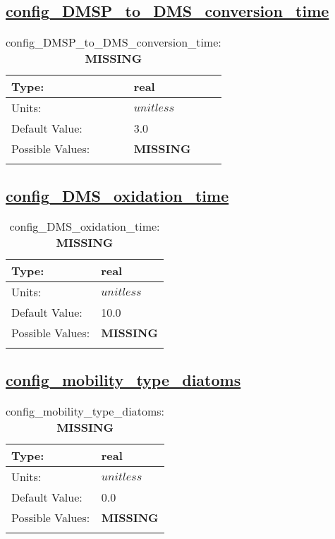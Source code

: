 \subsection[config\_DMSP\_to\_DMS\_conversion\_time]{\hyperref[sec:nm_tab_biogeochemistry]{config\_DMSP\_to\_DMS\_conversion\_time}}
\label{subsec:nm_sec_config_DMSP_to_DMS_conversion_time}
\begin{center}
\begin{longtable}{| p{2.0in} || p{4.0in} |}
    \hline
    Type: & real \\
    \hline
    Units: & $unitless$ \\
    \hline
    Default Value: & 3.0 \\
    \hline
    Possible Values: & {\bf \color{red} MISSING} \\
    \hline
    \caption{config\_DMSP\_to\_DMS\_conversion\_time: {\bf \color{red} MISSING}}
\end{longtable}
\end{center}
\subsection[config\_DMS\_oxidation\_time]{\hyperref[sec:nm_tab_biogeochemistry]{config\_DMS\_oxidation\_time}}
\label{subsec:nm_sec_config_DMS_oxidation_time}
\begin{center}
\begin{longtable}{| p{2.0in} || p{4.0in} |}
    \hline
    Type: & real \\
    \hline
    Units: & $unitless$ \\
    \hline
    Default Value: & 10.0 \\
    \hline
    Possible Values: & {\bf \color{red} MISSING} \\
    \hline
    \caption{config\_DMS\_oxidation\_time: {\bf \color{red} MISSING}}
\end{longtable}
\end{center}
\subsection[config\_mobility\_type\_diatoms]{\hyperref[sec:nm_tab_biogeochemistry]{config\_mobility\_type\_diatoms}}
\label{subsec:nm_sec_config_mobility_type_diatoms}
\begin{center}
\begin{longtable}{| p{2.0in} || p{4.0in} |}
    \hline
    Type: & real \\
    \hline
    Units: & $unitless$ \\
    \hline
    Default Value: & 0.0 \\
    \hline
    Possible Values: & {\bf \color{red} MISSING} \\
    \hline
    \caption{config\_mobility\_type\_diatoms: {\bf \color{red} MISSING}}
\end{longtable}
\end{center}
